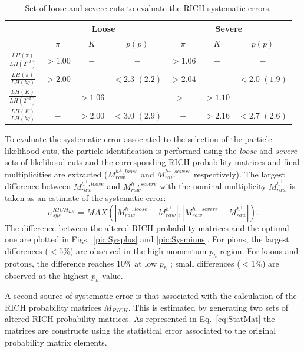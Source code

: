 \begin{table}[!h]
	\centering
	\begin{tabular}{ccccccc}
		\hline
		 & \multicolumn{3}{c}{Loose} & \multicolumn{3}{c}{Severe} \\
		\hline
		 & $\pi$ & $K$ & $p(\bar{p})$ & $\pi$ & $K$ & $p(\bar{p})$ \\
		\hline
		$\frac{LH(\pi)}{LH(2^{nd})}$ & $> 1.00$ & $-$ & $-$ & $>1.06$ & $-$ & $-$ \\
		$\frac{LH(\pi)}{LH(bg)}$ & $> 2.00$ & $-$ & $<2.3$ $(2.2)$ & $>2.04$ & $-$ & $<2.0$ $(1.9)$ \\
		$\frac{LH(K)}{LH(2^{nd})}$ & $-$ & $>1.06$ & $-$ & $>-$ & $>1.10$ & $-$ \\
		$\frac{LH(K)}{LH(bg)}$ & $-$ & $>2.00$ & $<3.0$ $(2.9)$ & $-$ & $>2.16$ & $<2.7$ $(2.6)$ \\
		\hline
	\end{tabular}
  \caption{Set of loose and severe cuts to evaluate the RICH systematic errors.}
  \label{tab:loose.severe}
\end{table}

To evaluate the systematic error associated to the selection of the particle likelihood cuts, the particle identification is performed using the \textit{loose}
and \textit{severe} sets of likelihood cuts and the corresponding RICH probability matrices and final multiplicities are extracted ($M^{h^{\pm},loose}_{raw}$
and $M^{h^{\pm},severe}_{raw}$ respectively). The largest difference between $M^{h^{\pm},loose}_{raw}$ and $M^{h^{\pm},severe}_{raw}$ with the nominal
multiplicity $M^{h^{\pm}}_{raw}$ is taken as an estimate of the systematic error:
%
\begin{equation}
  \sigma^{RICH_{LH}}_{sys} = MAX(|M^{h^{\pm},loose}_{raw}-M^{h^{\pm}}_{raw}|,|M^{h^{\pm},severe}_{raw}-M^{h^{\pm}}_{raw}|).
\end{equation}
%
The difference between the altered RICH probability matrices and the optimal one are plotted in Figs.~\ref{pic:Sysplus} and \ref{pic:Sysminus}. For pions, the largest differences
($<5$\%) are observed in the high momentum $p_h$ region. For kaons and protons, the difference reaches $10$\% at low $p_h$ ; small differences ($<1$\%) are observed at the
highest $p_h$ value.

A second source of systematic error is that associated with the calculation of the RICH probability matrices $M_{RICH}$. This is estimated by generating two sets of altered RICH probability matrices. As represented in Eq.~\ref{eq:StatMat} the matrices are constructe using the statistical error associated to the original probability matrix elements.

